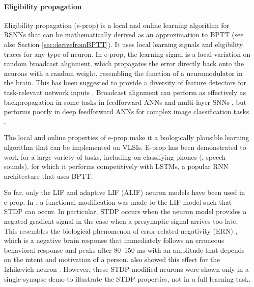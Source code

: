 \paragraph{Eligibility propagation}
Eligibility propagation (e-prop) \citep{bellec2020solution} is a local and online learning algorithm for RSNNs that can be mathematically derived as an approximation to BPTT (see also Section \ref{sec:derivefromBPTT}).
It uses local learning signals and eligibility traces for any type of neuron.
In e-prop, the learning signal is a local variation on random broadcast alignment, which propagates the error directly back onto the neurons with a random weight, resembling the function of a neuromodulator in the brain.
This has been suggested to provide a diversity of feature detectors for task-relevant network inputs \citep{bellec2020solution}.
Broadcast alignment can perform as effectively as backpropagation in some tasks in feedforward ANNs \citep{lillicrap2016random,nokland2016direct} and multi-layer SNNs \citep{samadi2017deep,clopath2010connectivity}, but performs poorly in deep feedforward ANNs for complex image classification tasks \citep{bartunov2018assessing}.

The local and online properties of e-prop make it a biologically plausible learning algorithm that can be implemented on VLSIs.
E-prop has been demonstrated to work for a large variety of tasks, including on classifying phones (\ie, speech sounds), for which it performs competitively with LSTMs, a popular RNN architecture that uses BPTT.

So far, only the LIF and adaptive LIF (ALIF) neuron models have been used in e-prop. In \citet{traub2020learning}, a functional modification was made to the LIF model such that STDP can occur.
In particular, STDP occurs when the neuron model provides a negated gradient signal in the case when a presynaptic signal arrives too late.
This resembles the biological phenomenon of error-related negativity (ERN) \citep{nieuwenhuis2001error}, which is a negative brain response that immediately follows an erroneous behavioral response and peaks after 80--150 ms with an amplitude that depends on the intent and motivation of a person.
\citet{traub2020learning} also showed this effect for the Izhikevich neuron \citep{izhikevich2003simple}.
However, these STDP-modified neurons were shown only in a single-synapse demo to illustrate the STDP properties, not in a full learning task.


